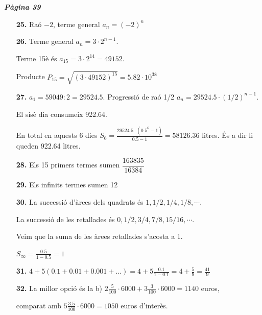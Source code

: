 \documentclass[a4paper, pdf, twoside]{book}
\begin{document}
\begin{multicols}{2}
{\textbf{\em Pàgina 39}} \hrulefill
\begin{enumerate}
\vspace{0.25cm}
\item[\fontfamily{phv}\selectfont\color{blue}\textbf{25. }]  \scalebox{0.6}{\simbolclau } 
Raó $-2$, terme general $a_n=(-2)^n$
 \end{enumerate}
\begin{enumerate}
\vspace{0.25cm}
\item[\fontfamily{phv}\selectfont\color{blue}\textbf{26. }] 
Terme general $a_n=3\cdot 2^{n-1}$.\par Terme 15è és $a_{15}=3\cdot 2^{14}=49152$.\par Producte $P_{15}=\sqrt {(3\cdot 49152)^{15}}=5.82\cdot 10^{38}$
\vspace{0.25cm}
\item[\fontfamily{phv}\selectfont\color{blue}\textbf{27. }] 
$a_1=59049:2=29524.5$. Progressió de raó 1/2 $a_n=29524.5 \cdot (1/2)^{n-1}$.\par El sisè dia consumeix 922.64.\par En total en aquests 6 dies $S_6= \frac {29524.5 \cdot (0.5^6-1)}{0.5-1}=58126.36$ litres. És a dir li queden 922.64 litres.
\vspace{0.25cm}
\item[\fontfamily{phv}\selectfont\color{blue}\textbf{28. }]  \scalebox{0.6}{\simbolclau } 
Els 15 primers termes sumen $\dfrac {163835}{16384}$
\vspace{0.25cm}
\item[\fontfamily{phv}\selectfont\color{blue}\textbf{29. }]  \scalebox{0.6}{\simbolclau } 
Els infinits termes sumen 12
\vspace{0.25cm}
\item[\fontfamily{phv}\selectfont\color{blue}\textbf{30. }] 
La successió d'àrees dels quadrats és $1, 1/2, 1/4, 1/8, \cdots $.\par La successió de les retallades és $0, 1/2, 3/4, 7/8, 15/16, \cdots $. \par Veim que la suma de les àrees retallades s'acosta a 1.\par $S_\infty =\frac {0.5}{1-0.5}=1$ 
\vspace{0.25cm}
\item[\fontfamily{phv}\selectfont\color{blue}\textbf{31. }] 
$4+5(0.1+0.01+0.001+...)=4+5\frac {0.1}{1-0.1}=4+\frac {5}{9}=\frac {41}{9}$
\vspace{0.25cm}
\item[\fontfamily{phv}\selectfont\color{blue}\textbf{32. }] 
La millor opció és la b) $2\frac {5}{100}\cdot 6000+3\frac {3}{100}\cdot 6000=1140$ euros,\par comparat amb $5\frac {3.5}{100}\cdot 6000= 1050$ euros d'interès.
 \end{enumerate}
\vspace{0.3cm}


\end{multicols}
\end{document}
